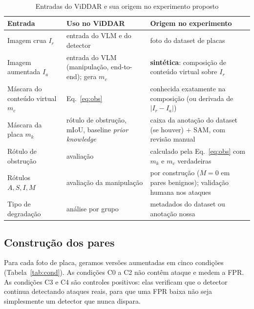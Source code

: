 \documentclass[journal,onecolumn]{IEEEtran}
\newcommand{\Ir}{I_r}
\newcommand{\Ia}{I_a}
\begin{document}
\begin{table}[!t]
\renewcommand{\arraystretch}{1.2}
\caption{Entradas do ViDDAR e sua origem no experimento proposto}
\label{tab:inputs}
\centering
\footnotesize
\begin{tabular}{L{3.4cm}L{5.2cm}L{6.6cm}}
\toprule
Entrada & Uso no ViDDAR & Origem no experimento \\
\midrule
Imagem crua $\Ir$ & entrada do VLM e do detector & foto do dataset de placas \\
Imagem aumentada $\Ia$ & entrada do VLM (manipulação, end-to-end); gera $m_c$ & \textbf{sintética}: composição de conteúdo virtual sobre $\Ir$ \\
Máscara do conteúdo virtual $m_c$ & Eq.~\eqref{eq:obs} & conhecida exatamente na composição (ou derivada de $|\Ir-\Ia|$) \\
Máscara da placa $m_k$ & rótulo de obstrução, mIoU, baseline \emph{prior knowledge} & caixa da anotação do dataset (se houver) + SAM, com revisão manual \\
Rótulo de obstrução & avaliação & calculado pela Eq.~\eqref{eq:obs} com $m_k$ e $m_c$ verdadeiras \\
Rótulos $A,S,I,M$ & avaliação da manipulação & por construção ($M=0$ em pares benignos); validação humana nos ataques \\
Tipo de degradação & análise por grupo & metadados do dataset ou anotação nossa \\
\bottomrule
\end{tabular}
\end{table}

\subsection{Construção dos pares}
Para cada foto de placa, geramos versões aumentadas em cinco condições (Tabela~\ref{tab:cond}). As
condições C0 a C2 não contêm ataque e medem a FPR. As condições C3 e C4 são controles positivos: elas
verificam que o detector continua detectando ataques reais, para que uma FPR baixa não seja
simplesmente um detector que nunca dispara.
\end{document}
